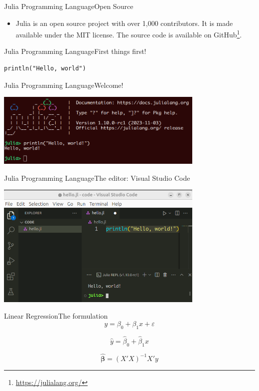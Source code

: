 \documentclass[11pt]{beamer}
\begin{document}
\begin{frame}[fragile]{Julia Programming Language}{Open Source}
	\begin{itemize}
		\item Julia is an open source project with over 1,000 contributors. It is made available under the MIT license. The source code is available on GitHub\footnote{\url{https://julialang.org/}}.
	\end{itemize}
\end{frame}


\begin{frame}[fragile]{Julia Programming Language}{First things first!}
\begin{lstlisting}
println("Hello, world")
\end{lstlisting}
\end{frame}


\begin{frame}[fragile]{Julia Programming Language}{Welcome!}
	\begin{center}
			\includegraphics[width=10cm]{images/welcome.png}
	\end{center}
\end{frame}


\begin{frame}[fragile]{Julia Programming Language}{The editor: Visual Studio Code}
	\begin{center}
		\includegraphics[width=10cm]{images/vscode.png}
	\end{center}
\end{frame}


\begin{frame}[fragile]{Linear Regression}{The formulation}
\begin{equation}
y = \beta_0 + \beta_1 x + \varepsilon
\end{equation}

\begin{equation}
	\hat{y} = \hat{\beta}_0 + \hat{\beta}_1 x 
\end{equation}

\begin{equation}
	\hat{\boldsymbol{\beta}} = (X'X)^{-1}X'y
\end{equation}
\end{frame}
\end{document}
